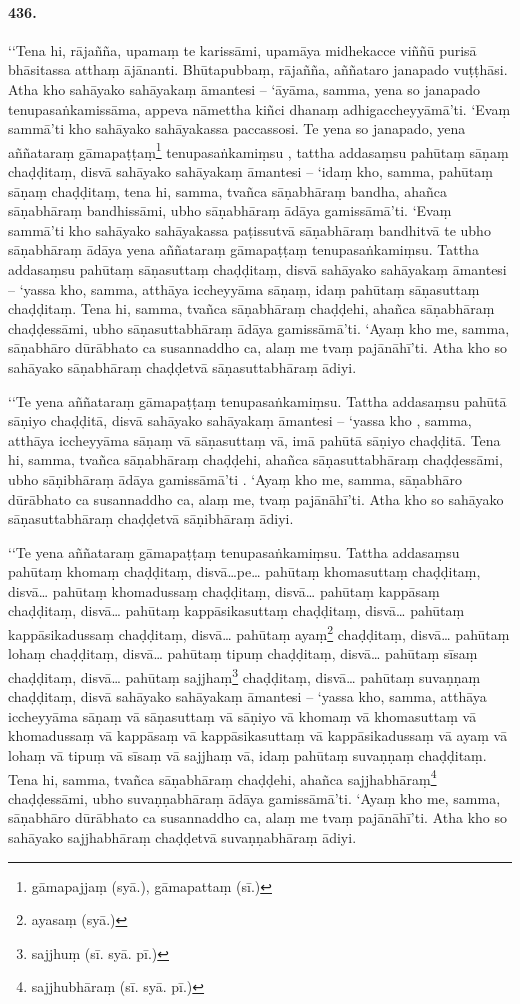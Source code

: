 \paragraph{436.} ‘‘Tena hi, rājañña, upamaṃ te karissāmi, upamāya midhekacce viññū purisā bhāsitassa atthaṃ ājānanti. Bhūtapubbaṃ, rājañña, aññataro janapado vuṭṭhāsi. Atha kho sahāyako sahāyakaṃ āmantesi – ‘āyāma, samma, yena so janapado tenupasaṅkamissāma, appeva nāmettha kiñci dhanaṃ adhigaccheyyāmā’ti. ‘Evaṃ sammā’ti kho sahāyako sahāyakassa paccassosi. Te yena so janapado, yena aññataraṃ gāmapaṭṭaṃ\footnote{gāmapajjaṃ (syā.), gāmapattaṃ (sī.)} tenupasaṅkamiṃsu , tattha addasaṃsu pahūtaṃ sāṇaṃ chaḍḍitaṃ, disvā sahāyako sahāyakaṃ āmantesi – ‘idaṃ kho, samma, pahūtaṃ sāṇaṃ chaḍḍitaṃ, tena hi, samma, tvañca sāṇabhāraṃ bandha, ahañca sāṇabhāraṃ bandhissāmi, ubho sāṇabhāraṃ ādāya gamissāmā’ti. ‘Evaṃ sammā’ti kho sahāyako sahāyakassa paṭissutvā sāṇabhāraṃ bandhitvā te ubho sāṇabhāraṃ ādāya yena aññataraṃ gāmapaṭṭaṃ tenupasaṅkamiṃsu. Tattha addasaṃsu pahūtaṃ sāṇasuttaṃ chaḍḍitaṃ, disvā sahāyako sahāyakaṃ āmantesi – ‘yassa kho, samma, atthāya iccheyyāma sāṇaṃ, idaṃ pahūtaṃ sāṇasuttaṃ chaḍḍitaṃ. Tena hi, samma, tvañca sāṇabhāraṃ chaḍḍehi, ahañca sāṇabhāraṃ chaḍḍessāmi, ubho sāṇasuttabhāraṃ ādāya gamissāmā’ti. ‘Ayaṃ kho me, samma, sāṇabhāro dūrābhato ca susannaddho ca, alaṃ me tvaṃ pajānāhī’ti. Atha kho so sahāyako sāṇabhāraṃ chaḍḍetvā sāṇasuttabhāraṃ ādiyi.

‘‘Te yena aññataraṃ gāmapaṭṭaṃ tenupasaṅkamiṃsu. Tattha addasaṃsu pahūtā sāṇiyo chaḍḍitā, disvā sahāyako sahāyakaṃ āmantesi – ‘yassa kho , samma, atthāya iccheyyāma sāṇaṃ vā sāṇasuttaṃ vā, imā pahūtā sāṇiyo chaḍḍitā. Tena hi, samma, tvañca sāṇabhāraṃ chaḍḍehi, ahañca sāṇasuttabhāraṃ chaḍḍessāmi, ubho sāṇibhāraṃ ādāya gamissāmā’ti . ‘Ayaṃ kho me, samma, sāṇabhāro dūrābhato ca susannaddho ca, alaṃ me, tvaṃ pajānāhī’ti. Atha kho so sahāyako sāṇasuttabhāraṃ chaḍḍetvā sāṇibhāraṃ ādiyi.

‘‘Te yena aññataraṃ gāmapaṭṭaṃ tenupasaṅkamiṃsu. Tattha addasaṃsu pahūtaṃ khomaṃ chaḍḍitaṃ, disvā…pe… pahūtaṃ khomasuttaṃ chaḍḍitaṃ, disvā… pahūtaṃ khomadussaṃ chaḍḍitaṃ, disvā… pahūtaṃ kappāsaṃ chaḍḍitaṃ, disvā… pahūtaṃ kappāsikasuttaṃ chaḍḍitaṃ, disvā… pahūtaṃ kappāsikadussaṃ chaḍḍitaṃ, disvā… pahūtaṃ ayaṃ\footnote{ayasaṃ (syā.)} chaḍḍitaṃ, disvā… pahūtaṃ lohaṃ chaḍḍitaṃ, disvā… pahūtaṃ tipuṃ chaḍḍitaṃ, disvā… pahūtaṃ sīsaṃ chaḍḍitaṃ, disvā… pahūtaṃ sajjhaṃ\footnote{sajjhuṃ (sī. syā. pī.)} chaḍḍitaṃ, disvā… pahūtaṃ suvaṇṇaṃ chaḍḍitaṃ, disvā sahāyako sahāyakaṃ āmantesi – ‘yassa kho, samma, atthāya iccheyyāma sāṇaṃ vā sāṇasuttaṃ vā sāṇiyo vā khomaṃ vā khomasuttaṃ vā khomadussaṃ vā kappāsaṃ vā kappāsikasuttaṃ vā kappāsikadussaṃ vā ayaṃ vā lohaṃ vā tipuṃ vā sīsaṃ vā sajjhaṃ vā, idaṃ pahūtaṃ suvaṇṇaṃ chaḍḍitaṃ. Tena hi, samma, tvañca sāṇabhāraṃ chaḍḍehi, ahañca sajjhabhāraṃ\footnote{sajjhubhāraṃ (sī. syā. pī.)} chaḍḍessāmi, ubho suvaṇṇabhāraṃ ādāya gamissāmā’ti. ‘Ayaṃ kho me, samma, sāṇabhāro dūrābhato ca susannaddho ca, alaṃ me tvaṃ pajānāhī’ti. Atha kho so sahāyako sajjhabhāraṃ chaḍḍetvā suvaṇṇabhāraṃ ādiyi.

